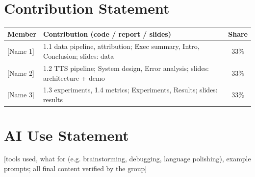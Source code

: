 \documentclass[11pt,a4paper]{article}
\newcommand{\ph}[1]{\colorbox{red!12}{\textcolor{red!70!black}{\small\textsf{[#1]}}}}
\begin{document}
\appendix
\section{Contribution Statement}
\begin{tabularx}{\linewidth}{@{}lXc@{}}
\toprule
Member & Contribution (code / report / slides) & Share \\ \midrule
\ph{Name 1} & 1.1 data pipeline, attribution; Exec summary, Intro, Conclusion; slides: data & 33\% \\
\ph{Name 2} & 1.2 TTS pipeline; System design, Error analysis; slides: architecture + demo & 33\% \\
\ph{Name 3} & 1.3 experiments, 1.4 metrics; Experiments, Results; slides: results & 33\% \\ \bottomrule
\end{tabularx}

\section{AI Use Statement}
\ph{tools used, what for (e.g. brainstorming, debugging, language polishing), example prompts; all final content verified by the group}
\end{document}
